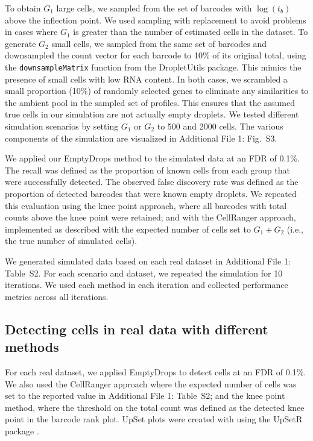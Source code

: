 \documentclass{bmcart}
\newcommand{\code}[1]{\texttt{#1}}
\newcommand{\ADD}[1]{Additional File 1: #1}
\newcommand{\supptabdataset}{S2}
\newcommand{\suppfigsimdesign}{S3}
\begin{document}
To obtain $G_1$ large cells, we sampled from the set of barcodes with $\log(t_b)$ above the inflection point.
We used sampling with replacement to avoid problems in cases where $G_1$ is greater than the number of estimated cells in the dataset.
To generate $G_2$ small cells, we sampled from the same set of barcodes and downsampled the count vector for each barcode to 10\% of its original total,
using the \code{downsampleMatrix} function from the \textsf{DropletUtils} package.
This mimics the presence of small cells with low RNA content. 
In both cases, we scrambled a small proportion (10\%) of randomly selected genes to eliminate any similarities to the ambient pool in the sampled set of profiles.
This ensures that the assumed true cells in our simulation are not actually empty droplets.
We tested different simulation scenarios by setting $G_1$ or $G_2$ to 500 and 2000 cells.
The various components of the simulation are visualized in \ADD{Fig.~\suppfigsimdesign{}}.

We applied our EmptyDrops method to the simulated data at an FDR of 0.1\%. 
The recall was defined as the proportion of known cells from each group that were successfully detected.
The observed false discovery rate was defined as the proportion of detected barcodes that were known empty droplets.
We repeated this evaluation using the knee point approach, where all barcodes with total counts above the knee point were retained;
and with the CellRanger approach, implemented as described \cite{zheng2017massively} with the expected number of cells set to $G_1+G_2$ (i.e., the true number of simulated cells).

We generated simulated data based on each real dataset in \ADD{Table~\supptabdataset{}}.
For each scenario and dataset, we repeated the simulation for 10 iterations.
We used each method in each iteration and collected performance metrics across all iterations.

\subsection*{Detecting cells in real data with different methods}
For each real dataset, we applied EmptyDrops to detect cells at an FDR of 0.1\%. 
We also used the CellRanger approach where the expected number of cells was set to the reported value in \ADD{Table~\supptabdataset{}};
and the knee point method, where the threshold on the total count was defined as the detected knee point in the barcode rank plot.
UpSet plots were created with using the \textsf{UpSetR} package \cite{lex2014upset}.
\end{document}
